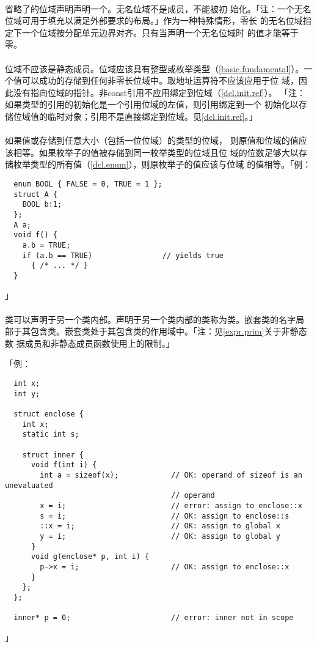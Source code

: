\paragraph{}
省略了的位域声明声明一个。无名位域不是成员，不能被初
始化。「注：一个无名位域可用于填充以满足外部要求的布局。」作为一种特殊情形，零长
的无名位域指定下一个位域按分配单元边界对齐。只有当声明一个无名位域时
的值才能等于零。

\paragraph{}
位域不应该是静态成员。位域应该具有整型或枚举类型（\ref{basic.fundamental}）。一
个值可以成功的存储到任何非零长位域中。取地址运算符\tm{\&}不应该应用于位
域，因此没有指向位域的指针。非const引用不应用绑定到位域（\ref{dcl.init.ref}）。
「注：如果类型的引用的初始化是一个引用位域的左值，则引用绑定到一个
初始化以存储位域值的临时对象；引用不是直接绑定到位域。见\ref{dcl.init.ref}。」

\paragraph{}
如果值或存储到任意大小（包括一位位域）的类型的位域，
则原值和位域的值应该相等。如果枚举子的值被存储到同一枚举类型的位域且位
域的位数足够大以存储枚举类型的所有值（\ref{dcl.enum}），则原枚举子的值应该与位域
的值相等。「例：
\begin{lstlisting}
  enum BOOL { FALSE = 0, TRUE = 1 };
  struct A {
    BOOL b:1;
  };
  A a;
  void f() {
    a.b = TRUE;
    if (a.b == TRUE)                // yields true
      { /* ... */ }
  }
\end{lstlisting}」

\paragraph{}
类可以声明于另一个类内部。声明于另一个类内部的类称为类。嵌套类的名字局
部于其包含类。嵌套类处于其包含类的作用域中。「注：见\ref{expr.prim}关于非静态数
据成员和非静态成员函数使用上的限制。」

「例：
\begin{lstlisting}
  int x;
  int y;

  struct enclose {
    int x;
    static int s;

    struct inner {
      void f(int i) {
        int a = sizeof(x);            // OK: operand of sizeof is an unevaluated
                                      // operand
        x = i;                        // error: assign to enclose::x
        s = i;                        // OK: assign to enclose::s
        ::x = i;                      // OK: assign to global x
        y = i;                        // OK: assign to global y
      }
      void g(enclose* p, int i) {
        p->x = i;                     // OK: assign to enclose::x
      }
    };
  };

  inner* p = 0;                       // error: inner not in scope
\end{lstlisting}」

